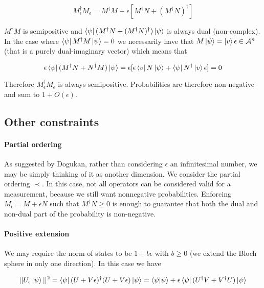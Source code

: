 \documentclass{article}
\newcommand{\A}{\mathcal{A}}
\newcommand{\e}{\epsilon}
\begin{document}
\begin{equation}
M_{\e}^\dagger M_{\e} = M^\dagger M + \e[M^\dagger N + (M^\dagger N)^\dagger]
\end{equation}

$M^\dagger M$ is semipositive and $\bra{\psi} (M^\dagger N + (M^\dagger N)^\dagger) \ket{\psi}$ is always dual (non-complex). In the case where $\bra{\psi} M^\dagger M \ket{\psi} = 0$ we necessarily have that $M \ket{\psi} = \ket{v} \e \in \A^n$ (that is a purely dual-imaginary vector) which means that

\begin{equation}
\e \bra{\psi} (M^\dagger N + N^\dagger M) \ket{\psi} = \e [\e \bra{v} N \ket{\psi} + \bra{\psi} N^\dagger \ket{v} \e] = 0
\end{equation}

Therefore $M_{\e}^\dagger M_{\e}$ is always semipositive. Probabilities are therefore non-negative and sum to $1 + O(\e)$.

\subsection{Other constraints}

\paragraph{Partial ordering} As suggested by Dogukan, rather than considering $\e$ an infinitesimal number, we may be simply thinking of it as another dimension. We consider the partial ordering $\prec$. In this case, not all operators can be considered valid for a measurement, because we still want nonnegative probabilities. Enforcing $M_{\e} = M + \e N$ such that $M^\dagger N \geq 0$ is enough to guarantee that both the dual and non-dual part of the probability is non-negative.

\paragraph{Positive extension} We may require the norm of states to be $1 + b \e$ with $b \geq 0$ (we extend the Bloch sphere in only one direction). In this case we have

\begin{equation}
||U_{\e} \ket{\psi}||^2 = \bra{\psi} (U + V \e)^\dagger (U + V \e) \ket{\psi} = \braket{\psi | \psi} + \e \bra{\psi}(U^\dagger V + V^\dagger U) \ket{\psi}
\end{equation}
\end{document}
